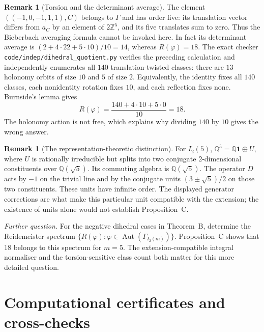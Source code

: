 \documentclass[11pt]{article}
\theoremstyle{definition}
\newtheorem{remark}[theorem]{Remark}
\newcommand{\Z}{\mathbb{Z}}
\newcommand{\Q}{\mathbb{Q}}
\newcommand{\Aut}{\operatorname{Aut}}
\begin{document}
\begin{remark}[Torsion and the determinant average]\label{rem:dihedral-average}
The element $((-1,0,-1,1,1),C)$ belongs to $\Gamma$ and has order five: its translation vector differs
from $a_C$ by an element of $2\Z^5$, and its five translates sum to zero. Thus the Bieberbach averaging
formula \cite[Thm.~3.4]{DKT19} cannot be invoked here. In fact its determinant average is
$(2+4\cdot22+5\cdot10)/10=14$, whereas $R(\varphi)=18$.
The exact checker \texttt{code/indep/dihedral\_quotient.py} verifies the preceding calculation and independently
enumerates all $140$ translation-twisted classes: there are $13$ holonomy orbits of size $10$ and $5$ of size $2$.
Equivalently, the identity fixes all $140$ classes, each nonidentity rotation fixes $10$, and each
reflection fixes none. Burnside's lemma gives
\[R(\varphi)=\frac{140+4\cdot10+5\cdot0}{10}=18.\]
The holonomy action is not free, which explains why dividing $140$ by $10$ gives the wrong answer.
\end{remark}

\begin{remark}[The representation-theoretic distinction]
For $I_2(5)$, $\Q^5=\Q\mathbf1\oplus U$, where $U$ is rationally irreducible but splits into two conjugate
$2$-dimensional constituents over $\Q(\sqrt5)$. Its commuting algebra is $\Q(\sqrt5)$.
The operator $D$ acts by $-1$ on the trivial line and by the conjugate units
$(3\pm\sqrt5)/2$ on those two constituents. These units have infinite order. The displayed generator
corrections are what make this particular unit compatible with the extension; the existence of units
alone would not establish Proposition~C.
\end{remark}

\smallskip\noindent\emph{Further question.} For the negative dihedral cases in Theorem~B, determine the
Reidemeister spectrum
$\{R(\varphi):\varphi\in\Aut(\Gamma_{I_2(m)})\}$. Proposition~C shows that $18$ belongs to this spectrum for
$m=5$. The extension-compatible integral normaliser and the torsion-sensitive class count both matter
for this more detailed question.

\appendix
\section{Computational certificates and cross-checks}\label{app:comp}
\end{document}
